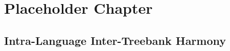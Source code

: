 \chapter{Placeholder Chapter}

\section{Intra-Language Inter-Treebank Harmony}
\label{ssec:harmony}


